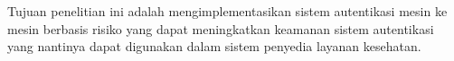Tujuan penelitian ini adalah mengimplementasikan sistem autentikasi mesin ke mesin berbasis risiko yang dapat meningkatkan keamanan sistem autentikasi yang nantinya dapat digunakan dalam sistem penyedia layanan kesehatan.